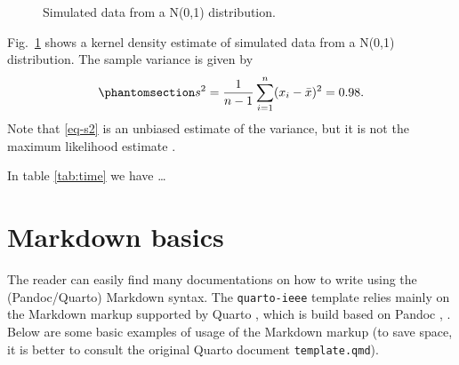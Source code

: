 \documentclass[
  journal,
]{IEEEtran}%
\begin{document}
\begin{figure}[H]


\caption{\label{fig-density0}Simulated data from a N(0,1) distribution.}

\end{figure}%

Fig.~\ref{fig-density0} shows a kernel density estimate of simulated
data from a N(0,1) distribution. The sample variance is given by
\begin{equation}\phantomsection\label{eq-s2}{
  s^2 = \frac{1}{n-1} \sum_{i=1}^n (x_i-\bar{x})^2 = 0.98.
}\end{equation} Note that \ref{eq-s2} is an unbiased estimate of the
variance, but it is not the maximum likelihood estimate
.

In table \ref{tab:time} we have \ldots{}

\section{Markdown basics}\label{sec-Markdown}

The reader can easily find many documentations on how to write using the
(Pandoc/Quarto) Markdown syntax. The \texttt{quarto-ieee} template
relies mainly on the Markdown markup supported by Quarto
, which is build based on Pandoc
,
. Below are some basic
examples of usage of the Markdown markup (to save space, it is better to
consult the original Quarto document \texttt{template.qmd}).
\end{document}
